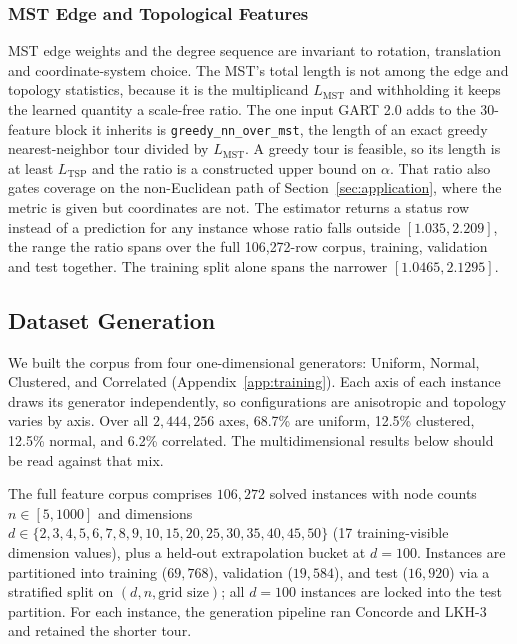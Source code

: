 \documentclass{article}
\begin{document}
\subsubsection{MST Edge and Topological Features}

MST edge weights and the degree sequence are invariant to rotation, translation and coordinate-system choice. The MST's total length is not among the edge and topology statistics, because it is the multiplicand $L_{\mathrm{MST}}$ and withholding it keeps the learned quantity a scale-free ratio. The one input GART 2.0 adds to the 30-feature block it inherits is \texttt{greedy\_nn\_over\_mst}, the length of an exact greedy nearest-neighbor tour divided by $L_{\mathrm{MST}}$. A greedy tour is feasible, so its length is at least $L_{\mathrm{TSP}}$ and the ratio is a constructed upper bound on $\alpha$. That ratio also gates coverage on the non-Euclidean path of Section~\ref{sec:application}, where the metric is given but coordinates are not. The estimator returns a status row instead of a prediction for any instance whose ratio falls outside $[1.035,2.209]$, the range the ratio spans over the full 106{,}272-row corpus, training, validation and test together. The training split alone spans the narrower $[1.0465,2.1295]$.

\subsection{Dataset Generation} \label{subsec:dataset}

We built the corpus from four one-dimensional generators: Uniform, Normal, Clustered, and Correlated (Appendix~\ref{app:training}). Each axis of each instance draws its generator independently, so configurations are anisotropic and topology varies by axis. Over all $2{,}444{,}256$ axes, 68.7\% are uniform, 12.5\% clustered, 12.5\% normal, and 6.2\% correlated. The multidimensional results below should be read against that mix.

The full feature corpus comprises $106{,}272$ solved instances with node counts $n \in [5, 1000]$ and dimensions $d \in \{2, 3, 4, 5, 6, 7, 8, 9, 10, 15, 20, 25, 30, 35, 40, 45, 50\}$ (17 training-visible dimension values), plus a held-out extrapolation bucket at $d = 100$. Instances are partitioned into training ($69{,}768$), validation ($19{,}584$), and test ($16{,}920$) via a stratified split on $(d, n, \text{grid size})$; all $d = 100$ instances are locked into the test partition. For each instance, the generation pipeline ran Concorde \citep{concorde2006} and LKH-3 \citep{helsgaun2017} and retained the shorter tour. 
\end{document}
